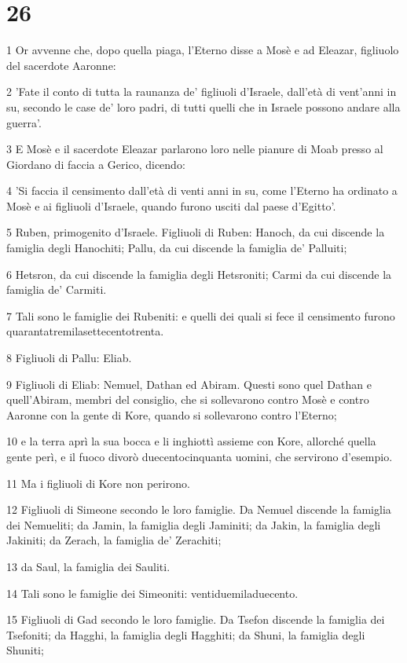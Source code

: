 \chapter{26}

\par 1 Or avvenne che, dopo quella piaga, l'Eterno disse a Mosè e ad Eleazar, figliuolo del sacerdote Aaronne:
\par 2 'Fate il conto di tutta la raunanza de' figliuoli d'Israele, dall'età di vent'anni in su, secondo le case de' loro padri, di tutti quelli che in Israele possono andare alla guerra'.
\par 3 E Mosè e il sacerdote Eleazar parlarono loro nelle pianure di Moab presso al Giordano di faccia a Gerico, dicendo:
\par 4 'Si faccia il censimento dall'età di venti anni in su, come l'Eterno ha ordinato a Mosè e ai figliuoli d'Israele, quando furono usciti dal paese d'Egitto'.
\par 5 Ruben, primogenito d'Israele. Figliuoli di Ruben: Hanoch, da cui discende la famiglia degli Hanochiti; Pallu, da cui discende la famiglia de' Palluiti;
\par 6 Hetsron, da cui discende la famiglia degli Hetsroniti; Carmi da cui discende la famiglia de' Carmiti.
\par 7 Tali sono le famiglie dei Rubeniti: e quelli dei quali si fece il censimento furono quarantatremilasettecentotrenta.
\par 8 Figliuoli di Pallu: Eliab.
\par 9 Figliuoli di Eliab: Nemuel, Dathan ed Abiram. Questi sono quel Dathan e quell'Abiram, membri del consiglio, che si sollevarono contro Mosè e contro Aaronne con la gente di Kore, quando si sollevarono contro l'Eterno;
\par 10 e la terra aprì la sua bocca e li inghiottì assieme con Kore, allorché quella gente perì, e il fuoco divorò duecentocinquanta uomini, che servirono d'esempio.
\par 11 Ma i figliuoli di Kore non perirono.
\par 12 Figliuoli di Simeone secondo le loro famiglie. Da Nemuel discende la famiglia dei Nemueliti; da Jamin, la famiglia degli Jaminiti; da Jakin, la famiglia degli Jakiniti; da Zerach, la famiglia de' Zerachiti;
\par 13 da Saul, la famiglia dei Sauliti.
\par 14 Tali sono le famiglie dei Simeoniti: ventiduemiladuecento.
\par 15 Figliuoli di Gad secondo le loro famiglie. Da Tsefon discende la famiglia dei Tsefoniti; da Hagghi, la famiglia degli Hagghiti; da Shuni, la famiglia degli Shuniti;
